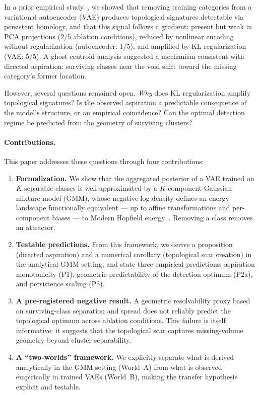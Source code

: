 \documentclass[11pt]{article}
\begin{document}
In a prior empirical study~\citep{rigaud2026gap}, we showed that removing
training categories from a variational autoencoder (VAE) produces topological
signatures detectable via persistent homology, and that this signal follows
a gradient: present but weak in PCA projections (2/5 ablation conditions),
reduced by nonlinear encoding without regularization (autoencoder: 1/5),
and amplified by KL regularization (VAE: 5/5).
A ghost centroid analysis suggested a mechanism consistent with directed
aspiration: surviving classes near the void shift toward the missing
category's former location.

However, several questions remained open.
\emph{Why} does KL regularization amplify topological signatures?
Is the observed aspiration a predictable consequence of the model's
structure, or an empirical coincidence?
Can the optimal detection regime be predicted from the geometry of
surviving clusters?

\paragraph{Contributions.}
This paper addresses these questions through four contributions:

\begin{enumerate}
\item \textbf{Formalization.}
We show that the aggregated posterior of a VAE trained on $K$ separable
classes is well-approximated by a $K$-component Gaussian mixture model (GMM),
whose negative log-density defines an energy landscape functionally equivalent
--- up to affine transformations and per-component biases --- to Modern
Hopfield energy~\citep{ramsauer2020hopfield}.
Removing a class removes an attractor.

\item \textbf{Testable predictions.}
From this framework, we derive a proposition (directed aspiration) and a
numerical corollary (topological scar creation) in the analytical GMM
setting, and state three empirical predictions: aspiration monotonicity (P1),
geometric predictability of the detection optimum (P2a), and persistence
scaling (P3).

\item \textbf{A pre-registered negative result.}
A geometric resolvability proxy based on surviving-class separation and spread
does not reliably predict the topological optimum across ablation conditions.
This failure is itself informative: it suggests that the topological scar
captures missing-volume geometry beyond cluster separability.

\item \textbf{A ``two-worlds'' framework.}
We explicitly separate what is derived analytically in the GMM setting
(World~A) from what is observed empirically in trained VAEs (World~B),
making the transfer hypothesis explicit and testable.
\end{enumerate}
\end{document}
